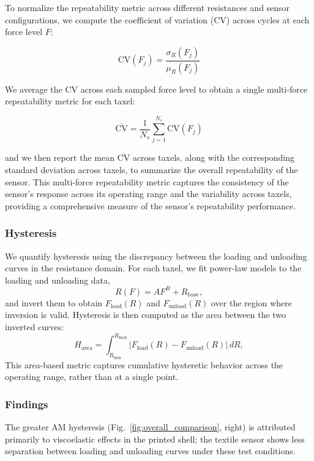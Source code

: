 To normalize the repeatability metric across different resistances and sensor configurations, we compute the coefficient of variation (CV) across cycles at each force level $F$:

\begin{equation}
\mathrm{CV}(F_j)=\frac{\sigma_R(F_j)}{\mu_R(F_j)}
\end{equation}

We average the CV across each sampled force level to obtain a single multi-force repeatability metric for each taxel:

\begin{equation}
\overline{\mathrm{CV}} = \frac{1}{N_s} \sum_{j=1}^{N_s} \mathrm{CV}(F_j)
\end{equation}

and we then report the mean $\overline{\mathrm{CV}}$ across taxels, along with the corresponding standard deviation across taxels, to summarize the overall repeatability of the sensor. This multi-force repeatability metric captures the consistency of the sensor's response across its operating range and the variability across taxels, providing a comprehensive measure of the sensor's repeatability performance.



\subsubsection{Hysteresis}
We quantify hysteresis using the discrepancy between the loading and unloading curves in the resistance domain. For each taxel, we fit power-law models to the loading and unloading data,
\begin{equation}
R(F)=AF^B+R_{\mathrm{base}},
\end{equation}
and invert them to obtain $F_{\text{load}}(R)$ and $F_{\text{unload}}(R)$ over the region where inversion is valid. Hysteresis is then computed as the area between the two inverted curves:
\begin{equation}
H_{\text{area}} = \int_{R_{\text{min}}}^{R_{\text{max}}} \left|F_{\text{load}}(R) - F_{\text{unload}}(R)\right| \, dR,
\end{equation}
 This area-based metric captures cumulative hysteretic behavior across the operating range, rather than at a single point.


\subsubsection{Findings}
The greater AM hysteresis (Fig.~\ref{fig:overall_comparison}, right) is attributed primarily to viscoelastic effects in the printed shell; the textile sensor shows less separation between loading and unloading curves under these test conditions.

